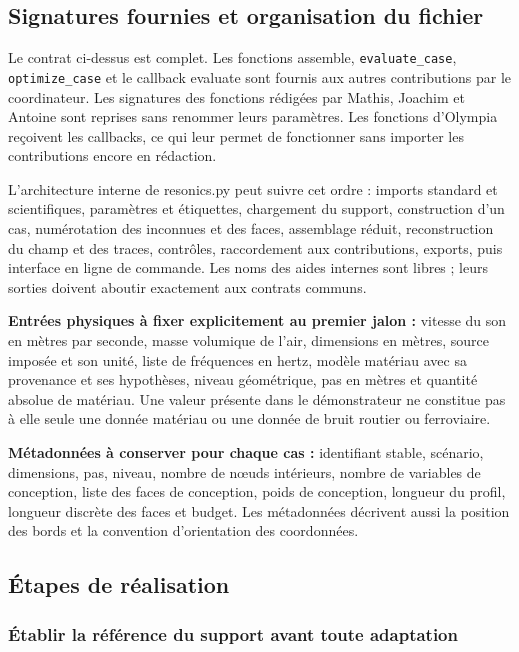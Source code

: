 \documentclass[11pt,a4paper]{article}
\begin{document}
\subsection{Signatures fournies et organisation du fichier}

Le contrat ci-dessus est complet. Les fonctions {\small\ttfamily assemble}, {\small\ttfamily \nolinkurl{evaluate_case}}, {\small\ttfamily \nolinkurl{optimize_case}} et le callback {\small\ttfamily evaluate} sont fournis aux autres contributions par le coordinateur. Les signatures des fonctions rédigées par Mathis, Joachim et Antoine sont reprises sans renommer leurs paramètres. Les fonctions d'Olympia reçoivent les callbacks, ce qui leur permet de fonctionner sans importer les contributions encore en rédaction.

L'architecture interne de {\small\ttfamily resonics.py} peut suivre cet ordre : imports standard et scientifiques, paramètres et étiquettes, chargement du support, construction d'un cas, numérotation des inconnues et des faces, assemblage réduit, reconstruction du champ et des traces, contrôles, raccordement aux contributions, exports, puis interface en ligne de commande. Les noms des aides internes sont libres ; leurs sorties doivent aboutir exactement aux contrats communs.

\textbf{Entrées physiques à fixer explicitement au premier jalon :} vitesse du son en mètres par seconde, masse volumique de l'air, dimensions en mètres, source imposée et son unité, liste de fréquences en hertz, modèle matériau avec sa provenance et ses hypothèses, niveau géométrique, pas en mètres et quantité absolue de matériau. Une valeur présente dans le démonstrateur ne constitue pas à elle seule une donnée matériau ou une donnée de bruit routier ou ferroviaire.

\textbf{Métadonnées à conserver pour chaque cas :} identifiant stable, scénario, dimensions, pas, niveau, nombre de nœuds intérieurs, nombre de variables de conception, liste des faces de conception, poids de conception, longueur du profil, longueur discrète des faces et budget. Les métadonnées décrivent aussi la position des bords et la convention d'orientation des coordonnées.

\subsection{Étapes de réalisation}

\subsubsection{Établir la référence du support avant toute adaptation}
\end{document}
